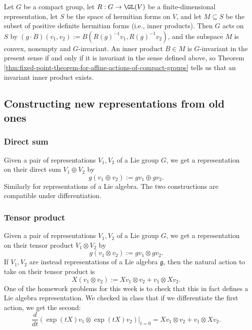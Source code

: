 \documentclass[reqno]{amsart} 
\begin{document}
\begin{example}
  Let $G$ be a compact group, let $R : G \rightarrow \GL(V)$ be
  a finite-dimensional representation, let $S$ be the space of
  hermitian forms on $V$, and let $M \subseteq S$ be the subset
  of positive definite hermitian forms (i.e., inner products).
  Then $G$ acts on $S$ by
  $(g \cdot B)(v_1,v_2) := B(R(g)^{-1} v_1, R(g)^{-1} v_2)$, and
  the subspace $M$ is convex, nonempty and $G$-invariant.  An
  inner product $B \in M$ is $G$-invariant in the present sense
  if and only if it is invariant in the sense defined above, so
  Theorem
  \ref{thm:fixed-point-theorem-for-affine-actions-of-compact-groups}
  tells us that an invariant inner product exists.
\end{example}

\subsection{Constructing new representations from old ones}
\label{sec:orgfb8c0e1}
\subsubsection{Direct sum}
\label{sec:org3c4515a}
Given a pair of representations $V_1, V_2$ of a Lie group $G$,
we get a representation on their direct sum $V_1 \oplus V_2$
by
\begin{equation*}
  g (v_1 \oplus v_2) := g v_1 \oplus g v_2.
\end{equation*}
Similarly for representations of a Lie algebra.  The two constructions are compatible under differentiation.

\subsubsection{Tensor product}
\label{sec:orgb0fcad8}
Given a pair of representations $V_1, V_2$ of a Lie group $G$,
we get a representation on their tensor product $V_1 \otimes V_2$
by
\begin{equation*}
  g (v_1 \otimes v_2) := g v_1 \otimes g v_2.
\end{equation*}
If $V_1, V_2$ are instead representations
of a Lie algebra $\mathfrak{g}$,
then the natural action to take on their tensor product is
\begin{equation*}
  X (v_1 \otimes v_2) := X v_1 \otimes v_2 + v_1 \otimes X v_2.
\end{equation*}
One of the homework problems for this week is to check that this
in fact defines a Lie algebra representation.
We checked in class that if we differentiate
the first action, we get the second:
\begin{equation*}
  \frac{d}{d t} (\exp(t X) v_1 \otimes \exp(t X) v_2)|_{t=0}
  = X v_1 \otimes v_2 + v_1 \otimes X v_2.
\end{equation*}
\end{document}

